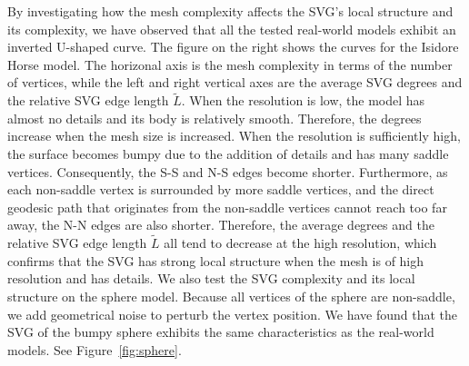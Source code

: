 \pichskip{1pt}%
   By investigating how the mesh complexity affects the SVG's local
structure and its complexity, we have observed that all the tested
real-world models exhibit an inverted U-shaped curve. The figure on
the right shows the curves for the Isidore Horse model. The
horizonal axis is the mesh complexity in terms of the number of
vertices, while the left and right vertical axes are the average SVG
degrees and the relative SVG edge length $\widetilde{L}$. When the
resolution is low, the model has almost no details and its body is
relatively smooth. Therefore, the degrees increase when the mesh
size is increased. When the resolution is sufficiently high, the
surface becomes bumpy due to the addition of details and has many
saddle vertices. Consequently, the S-S and N-S edges become shorter.
Furthermore, as each non-saddle vertex is surrounded by more saddle
vertices, and the direct geodesic path that originates from the
non-saddle vertices cannot reach too far away, the N-N edges are
also shorter. Therefore, the average degrees and the relative SVG
edge length $\widetilde{L}$ all tend to decrease at the high
resolution, which confirms that the SVG has strong local structure
when the mesh is of high resolution and has details. We also test
the SVG complexity and its local structure on the sphere model.
Because all vertices of the sphere are non-saddle, we add
geometrical noise to perturb the vertex position. We have found that
the SVG of the bumpy sphere exhibits the same characteristics as the
real-world models. See Figure~\ref{fig:sphere}.

